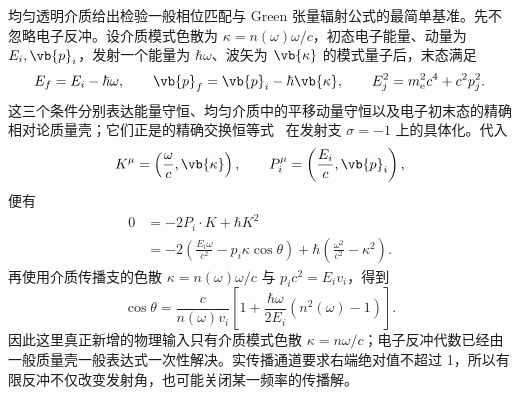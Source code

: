 均匀透明介质给出检验一般相位匹配与 Green 张量辐射公式的最简单基准。先不忽略电子反冲。设介质模式色散为 $\kappa=n(\omega)\omega/c$，初态电子能量、动量为 $E_i,\vb{p}_i$，发射一个能量为 $\hbar\omega$、波矢为 $\vb{\kappa}$ 的模式量子后，末态满足
\begin{equation}
{
E_f=E_i-\hbar\omega,
\qquad
\vb{p}_f=\vb{p}_i-\hbar\vb{\kappa},
\qquad
E_j^2=m_{\mathrm e}^2c^4+c^2p_j^2.}
\label{eq:cherenkov_exact_mass_shell}
\end{equation}
这三个条件分别表达能量守恒、均匀介质中的平移动量守恒以及电子初末态的精确相对论质量壳；它们正是的精确交换恒等式~ 在发射支 $\sigma=-1$ 上的具体化。代入
\begin{equation*}
K^\mu=\left(\frac{\omega}{c},\vb{\kappa}\right),
\qquad
P_i^\mu=\left(\frac{E_i}{c},\vb{p}_i\right),
\end{equation*}
便有
\begin{align*}
0
&=-2P_i\!\cdot K+\hbar K^2\\
&=-2\left(\frac{E_i \omega}{c^2}-p_i \kappa\cos\theta\right)
+\hbar\left(\frac{\omega^2}{c^2}-\kappa^2\right).
\end{align*}
再使用介质传播支的色散 $\kappa=n(\omega)\omega/c$ 与 $p_ic^2=E_iv_i$，得到
\begin{equation}
{
\cos\theta
=\frac{c}{n(\omega)v_i}
\left[1+\frac{\hbar\omega}{2E_i}(n^2(\omega)-1)\right].}
\label{eq:cherenkov_exact_recoil_angle}
\end{equation}
因此这里真正新增的物理输入只有介质模式色散 $\kappa=n\omega/c$；电子反冲代数已经由一般质量壳一般表达式一次性解决。实传播通道要求右端绝对值不超过 1，所以有限反冲不仅改变发射角，也可能关闭某一频率的传播解。

